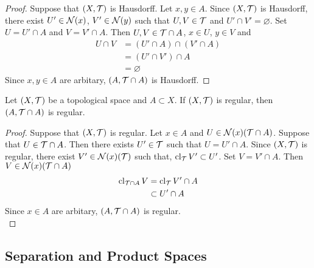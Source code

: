 \documentclass{book}
\begin{document}
	\begin{proof}
		Suppose that $(X, \mathcal{T})$ is Hausdorff. Let $x, y \in A$. Since $(X, \mathcal{T})$ is Hausdorff, there exist $U' \in \mathcal{N}(x)$, $V' \in \mathcal{N}(y)$ such that $U,V \in \mathcal{T}$ and $U' \cap V' = \varnothing$. Set $U = U' \cap A$ and $V = V' \cap A$. Then $U, V \in \mathcal{T} \cap A$, $x \in U$, $y \in V$ and 
		\begin{align*}
			U \cap V
			& = (U' \cap A) \cap (V' \cap A) \\
			& = (U' \cap V') \cap A \\
			& = \varnothing
		\end{align*}
		Since $x,y \in A$ are arbitary, $(A, \mathcal{T} \cap A)$ is Hausdorff.
	\end{proof}

	\begin{ex} 
		Let $(X, \mathcal{T})$ be a topological space and $A \subset X$. If $(X, \mathcal{T})$ is regular, then $(A, \mathcal{T} \cap A)$ is regular.
	\end{ex}
	
	\begin{proof}
		Suppose that $(X, \mathcal{T})$ is regular. Let $x \in A$ and $U \in \mathcal{N}(x)(\mathcal{T} \cap A)$. Suppose that $U \in \mathcal{T} \cap A$. Then there exists $U' \in \mathcal{T}$ such that $U = U' \cap A$. Since $(X, \mathcal{T})$ is regular, there exist $V' \in \mathcal{N}(x)(\mathcal{T})$ such that, $\operatorname{cl}_{\mathcal{T}} V' \subset U'$. Set $V = V' \cap A$. Then $V \in \mathcal{N}(x)(\mathcal{T} \cap A)$   
		\begin{align*}
			\operatorname{cl}_{\mathcal{T} \cap A} V
			& = \operatorname{cl}_{\mathcal{T}} V' \cap A \\
			& \subset U' \cap A
		\end{align*}
		Since $x \in A$ are arbitary, $(A, \mathcal{T} \cap A)$ is regular. \\
	\end{proof}































	\subsection{Separation and Product Spaces}
	
\end{document}
